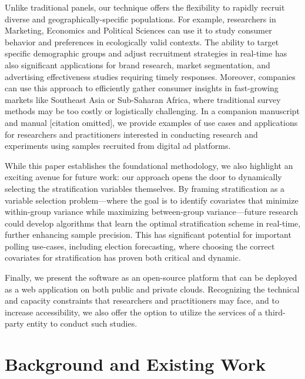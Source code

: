 Unlike traditional panels, our technique offers the flexibility to rapidly recruit diverse and geographically-specific populations. For example, researchers in Marketing, Economics and Political Sciences can use it to study consumer behavior and preferences in ecologically valid contexts. The ability to target specific demographic groups and adjust recruitment strategies in real-time has also significant applications for brand research, market segmentation, and advertising effectiveness studies requiring timely responses. Moreover, companies can use this approach to efficiently gather consumer insights in fast-growing markets like Southeast Asia or Sub-Saharan Africa, where traditional survey methods may be too costly or logistically challenging. In a companion manuscript and manual [citation omitted], we provide examples of use cases and applications for researchers and practitioners interested in conducting research and experiments using samples recruited from digital ad platforms.




While this paper establishes the foundational methodology, we also highlight an exciting avenue for future work: our approach opens the door to dynamically selecting the stratification variables themselves. By framing stratification as a variable selection problem—where the goal is to identify covariates that minimize within-group variance while maximizing between-group variance—future research could develop algorithms that learn the optimal stratification scheme in real-time, further enhancing sample precision. This has significant potential for important polling use-cases, including election forecasting, where choosing the correct covariates for stratification has proven both critical and dynamic.

Finally, we present the software as an open-source platform that can be deployed as a web application on both public and private clouds. Recognizing the technical and capacity constraints that researchers and practitioners may face, and to increase accessibility, we also offer the option to utilize the services of a third-party entity to conduct such studies. 



\section{Background and Existing Work}


